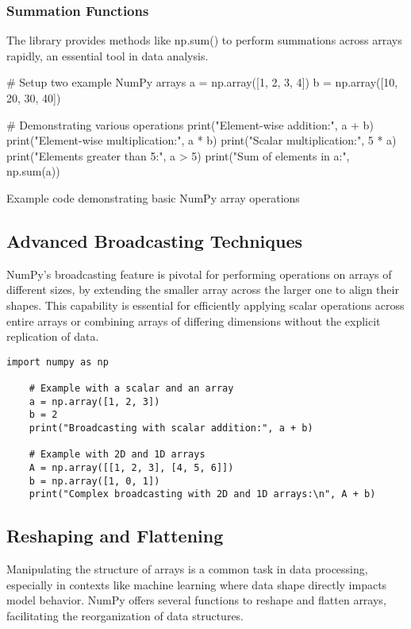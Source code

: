 \subsubsection{Summation Functions}
The library provides methods like np.sum() to perform summations across arrays rapidly, an essential tool in data analysis.

\begin{code}
	\begin{Python}
		# Setup two example NumPy arrays
		a = np.array([1, 2, 3, 4])
		b = np.array([10, 20, 30, 40])
		
		# Demonstrating various operations
		print("Element-wise addition:", a + b)
		print("Element-wise multiplication:", a * b)
		print("Scalar multiplication:", 5 * a)
		print("Elements greater than 5:", a > 5)
		print("Sum of elements in a:", np.sum(a))
	\end{Python}
	\caption{Example code demonstrating basic NumPy array operations}\label{code:numpy-array-operations}
\end{code}

\subsection{Advanced Broadcasting Techniques}
NumPy's broadcasting feature is pivotal for performing operations on arrays of different sizes, by extending the smaller array across the larger one to align their shapes. This capability is essential for efficiently applying scalar operations across entire arrays or combining arrays of differing dimensions without the explicit replication of data.

\begin{lstlisting}[caption={Example code demonstrating broadcasting in NumPy}, label={code:numpy-broadcasting}, style=pythonstyle]
	import numpy as np
	
	# Example with a scalar and an array
	a = np.array([1, 2, 3])
	b = 2
	print("Broadcasting with scalar addition:", a + b)
	
	# Example with 2D and 1D arrays
	A = np.array([[1, 2, 3], [4, 5, 6]])
	b = np.array([1, 0, 1])
	print("Complex broadcasting with 2D and 1D arrays:\n", A + b)
\end{lstlisting}

\subsection{Reshaping and Flattening}
Manipulating the structure of arrays is a common task in data processing, especially in contexts like machine learning where data shape directly impacts model behavior. NumPy offers several functions to reshape and flatten arrays, facilitating the reorganization of data structures.

